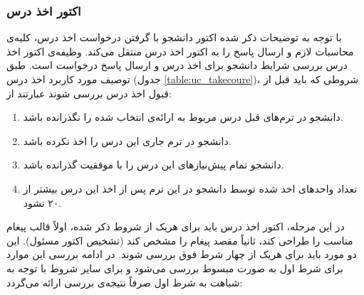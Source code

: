 \subsubsection{ اکتور اخذ درس}
\label{section:takeCourse}
با توجه به توضیحات ذکر شده اکتور دانشجو با گرفتن درخواست اخذ درس، کلیه‌ی محاسبات لازم و ارسال پاسخ را به اکتور اخذ درس منتقل می‌کند. وظیفه‌ی اکتور اخذ درس بررسی شرایط دانشجو برای اخذ درس و ارسال پاسخ درخواست است. طبق توصیف مورد کاربرد اخذ درس (جدول \ref{table:uc_takecoure})، شروطی که باید قبل از قبول اخذ درس بررسی شوند عبارتند از:
\begin{enumerate}
\item دانشجو در ترم‌های قبل درس مربوط به ارائه‌ی انتخاب شده را  نگذرانده باشد.
\item دانشجو در ترم‌ جاری این درس را اخذ نکرده باشد.
\item دانشجو تمام پیش‌نیاز‌های این درس را با موفقیت گذرانده باشد.
\item تعداد واحد‌های اخذ شده توسط دانشجو در این ترم پس از اخذ این درس بیشتر از ۲۰ نشود.
\end{enumerate}
در این مرحله، اکتور اخذ درس باید برای هریک از شروط ذکر شده، اولاً قالب پیغام مناسب را طراحی کند، ثانیاً مقصد پیغام را مشخص کند (تشخیص اکتور مسئول). این دو مورد باید برای هریک از چهار شرط فوق بررسی شوند. در ادامه بررسی این موارد برای شرط اول به صورت مبسوط بررسی می‌شود و برای سایر شروط با توجه به شباهت به شرط اول صرفاً نتیجه‌ی بررسی ارائه می‌گردد:
